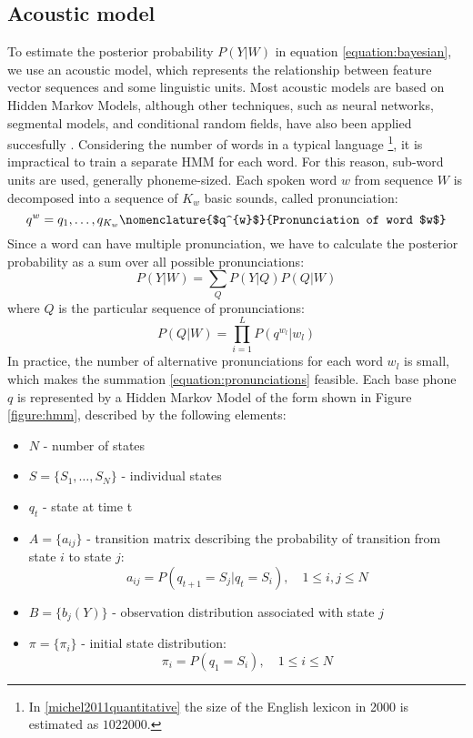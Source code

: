 \subsection{Acoustic model}
\label{section:acoustic}
To estimate the posterior probability $P(Y|W)$ in equation \ref{equation:bayesian}, we use an acoustic model, which represents the relationship between feature vector sequences and some linguistic units. Most acoustic models are based on Hidden Markov Models, although other techniques, such as neural networks, segmental models, and conditional random fields, have also been applied succesfully \cite{yu2009hidden, yu2008maximum, mohamed2012acoustic}. Considering the number of words in a typical language \footnote{In \ref{michel2011quantitative} the size of the English lexicon in 2000 is estimated as $1022000$.}, it is impractical to train a separate HMM for each word. For this reason, sub-word units are used, generally phoneme-sized. Each spoken word $w$ from sequence $W$ is decomposed into a sequence of $K_{w}$ basic sounds, called pronunciation:
\begin{equation}
  q^{w}=q_{1}, \ldots, q_{K_{w}}
  \nomenclature{$q^{w}$}{Pronunciation of word $w$}
\end{equation}
Since a word can have multiple pronunciation, we have to calculate the posterior probability as a sum over all possible pronunciations:
\begin{equation}
  \label{equation:pronunciations}
  P(Y|W) = \sum_{Q}P(Y|Q)P(Q|W)
\end{equation}
where $Q$ is the particular sequence of pronunciations:
\begin{equation}
  P(Q|W)=\prod_{i=1}^{L}P(q^{w_{l}}|w_{l})
\end{equation}
In practice, the number of alternative pronunciations for each word $w_{l}$ is small, which makes the summation \ref{equation:pronunciations} feasible. Each base phone $q$ is represented by a Hidden Markov Model of the form shown in Figure \ref{figure:hmm}, described by the following elements:

\begin{itemize}
\item $N$ - number of states
\item $S=\{S_{1}, \ldots, S_{N}\}$ - individual states
\item $q_{t}$ - state at time t
\item $A=\{a_{ij}\}$ - transition matrix describing the probability of transition from state $i$ to state $j$:
  \begin{equation}
    a_{ij}=P(q_{t+1}=S_{j}|q_{t}=S_{i}), \quad 1 \leqslant i, j \leqslant N 
  \end{equation}
\item $B=\{b_{j}(Y)\}$ - observation distribution associated with state $j$
\item $\pi=\{\pi_{i}\}$ - initial state distribution:
  \begin{equation}
    \pi_{i}=P(q_{1}=S_{i}),\quad 1 \leqslant i \leqslant N
  \end{equation}
\end{itemize}

